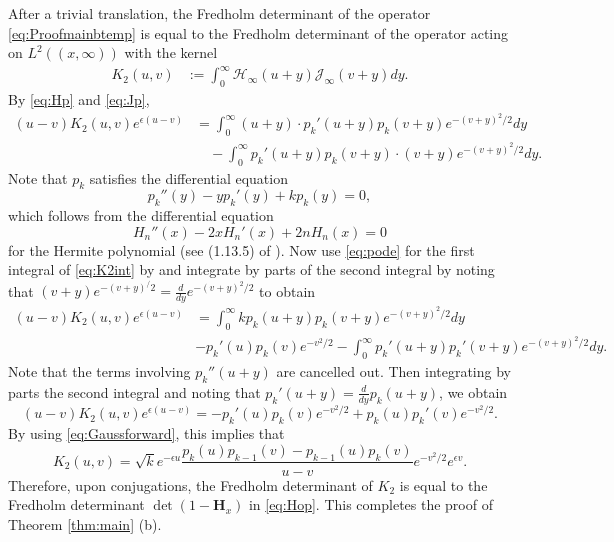 \documentclass[11pt]{article}
\begin{document}
After a trivial translation, the Fredholm determinant of the
operator \eqref{eq:Proofmainbtemp} is equal to the Fredholm
determinant of the operator acting on $L^2((x,\infty))$ with the
kernel
\begin{equation}
\begin{split}
  K_2(u,v) &:=  \int_0^\infty
  \mathcal{H}_\infty(u+y)\mathcal{J}_\infty(v+y) dy.
\end{split}
\end{equation}
By \eqref{eq:Hp} and \eqref{eq:Jp},
\begin{equation}\label{eq:K2int}
\begin{split}
  (u-v) K_2(u,v) e^{\epsilon (u-v)}
  & = \int_0^\infty (u+y) \cdot p_k'(u+y) p_k(v+y) e^{-(v+y)^2/2} dy \\
  &\quad - \int_0^\infty p_k'(u+y) p_k(v+y) \cdot (v+y) e^{-(v+y)^2/2}
  dy.
\end{split}
\end{equation}
Note that $p_k$ satisfies the differential equation
\begin{equation}\label{eq:pode}
  p_k''(y)-yp_k'(y)+kp_k(y)=0,
\end{equation}
which follows from the differential equation
\begin{equation}
  H_n''(x) - 2x H_n'(x) + 2nH_n(x)=0
\end{equation}
for the Hermite polynomial (see (1.13.5) of \cite{Koekoek}). Now
use \eqref{eq:pode} for the first integral of \eqref{eq:K2int} by
and integrate by parts of the second integral by noting that
$(v+y)e^{-(v+y)^/2}= \frac{d}{dy} e^{-(v+y)^2/2}$ to obtain
\begin{equation}
\begin{split}
  (u-v)K_2(u,v) e^{\epsilon (u-v)}
  & = \int_0^\infty k p_k(u+y)p_k(v+y) e^{-(v+y)^2/2} dy \\
  & - p_k'(u)p_k(v)e^{-v^2/2}
  - \int_0^\infty p_k'(u+y)p_k'(v+y) e^{-(v+y)^2/2} dy .
\end{split}
\end{equation}
Note that the terms involving $p_k''(u+y)$ are cancelled out. Then
integrating by parts the second integral and noting that
$p_k'(u+y)=\frac{d}{dy} p_k(u+y)$, we obtain
\begin{equation}
  (u-v)K_2(u,v) e^{\epsilon (u-v)}  = - p_k'(u)p_k(v)e^{-v^2/2} + p_k(u)p_k'(v)
  e^{-v^2/2}.
\end{equation}
By using \eqref{eq:Gaussforward}, this implies that
\begin{equation}
  K_2(u,v) = \sqrt{k} e^{-\epsilon u}
  \frac{p_k(u)p_{k-1}(v)-p_{k-1}(u)p_k(v)}{u-v} e^{-v^2/2} e^{\epsilon
  v}.
\end{equation}
Therefore, upon conjugations, the Fredholm determinant of $K_2$ is
equal to the Fredholm determinant $\det(1-\mathbf{H}_x)$ in
\eqref{eq:Hop}. This completes the proof of Theorem \ref{thm:main}
(b).
\end{document}

